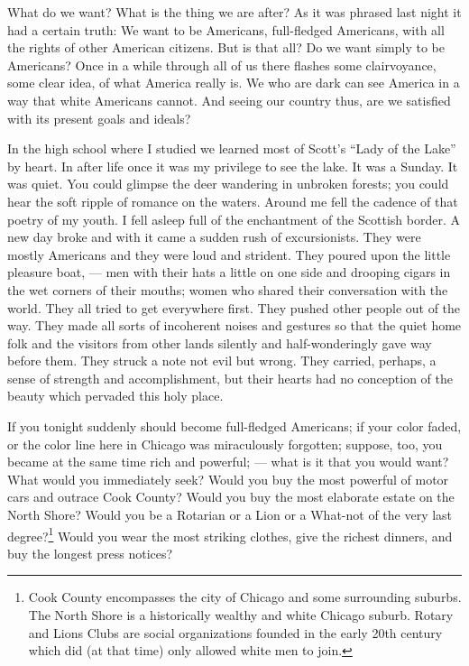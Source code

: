 \documentclass[12pt]{article}
\begin{document}
{\duboispara}%
What do we want? What is the thing we are after? As it was phrased last night it had a certain truth: We want to be Americans, full-fledged Americans, with all the rights of other American citizens. But is that all? Do we want simply to be Americans? Once in a while through all of us there flashes some clairvoyance, some clear idea, of what America really is. We who are dark can see America in a way that white Americans cannot. And seeing our country thus, are we satisfied with its present goals and ideals?  

{\duboispara}%
In the high school where I studied we learned most of Scott's ``Lady of the Lake'' by heart. In after life once it was my privilege to see the lake. It was a Sunday. It was quiet. You could glimpse the deer wandering in unbroken forests; you could hear the soft ripple of romance on the waters. Around me fell the cadence of that poetry of my youth. I fell asleep full of the enchantment of the Scottish border. A new day broke and with it came a sudden rush of excursionists. They were mostly Americans and they were loud and strident. They poured upon the little pleasure boat, --- men with their hats a little on one side and drooping cigars in the wet corners of their mouths; women who shared their conversation with the world. They all tried to get everywhere first. They pushed other people out of the way. They made all sorts of incoherent noises and gestures so that the quiet home folk and the visitors from other lands silently and half-wonderingly gave way before them. They struck a note not evil but wrong. They carried, perhaps, a sense of strength and accomplishment, but their hearts had no conception of the beauty which pervaded this holy place. 

{\duboispara}%
If you tonight suddenly should become full-fledged Americans; if your color faded, or the color line here in Chicago was miraculously forgotten; suppose, too, you became at the same time rich and powerful; --- what is it that you would want? What would you immediately seek? Would you buy the most powerful of motor cars and outrace Cook County? Would you buy the most elaborate estate on the North Shore? Would you be a Rotarian or a Lion or a What-not of the very last degree?\footnote{Cook County encompasses the city of Chicago and some surrounding suburbs. The North Shore is a historically wealthy and white Chicago suburb. Rotary and Lions Clubs are social organizations founded in the early 20th century which did (at that time) only allowed white men to join.} Would you wear the most striking clothes, give the richest dinners, and buy the longest press notices?
\end{document}
